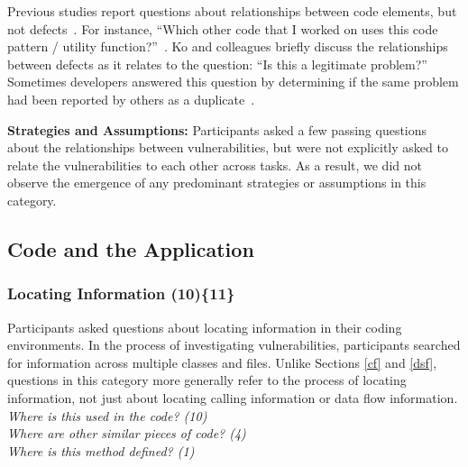 \documentclass[10pt,journal,compsoc]{IEEEtran}
\begin{document}
Previous studies report questions about relationships between code elements, but not defects~\cite{fritz2010using, latoza2010hard}. 
For instance, ``Which other code that I worked on uses this code pattern / utility function?''~\cite{fritz2010using}.
Ko and colleagues briefly discuss the relationships between defects as it relates to the question: ``Is this a legitimate problem?'' 
Sometimes developers answered this question by determining if the same problem had been reported by others as a duplicate~\cite{Ko:2007:information}.

\textbf{Strategies and Assumptions:}
Participants asked a few passing questions about the relationships between vulnerabilities, but were not explicitly asked to relate the vulnerabilities to each other across tasks. 
As a result, we did not observe the emergence of any predominant strategies or assumptions in this category.

%


\subsection{Code and the Application}
\label{sec:results-ca}
\subsubsection{Locating Information (10)\{11\}}\label{li}

Participants asked questions about locating information in their coding environments.
In the process of investigating vulnerabilities, participants searched for information across multiple classes and files.
Unlike Sections \ref{cf} and \ref{dsf}, questions in this category more generally refer to the process of locating information, not just about locating calling information or data flow information.
\\

\noindent\emph{Where is this used in the code? (10)} \\
\emph{Where are other similar pieces of code? (4)} \\
\emph{Where is this method defined? (1)} 
\\
\end{document}
